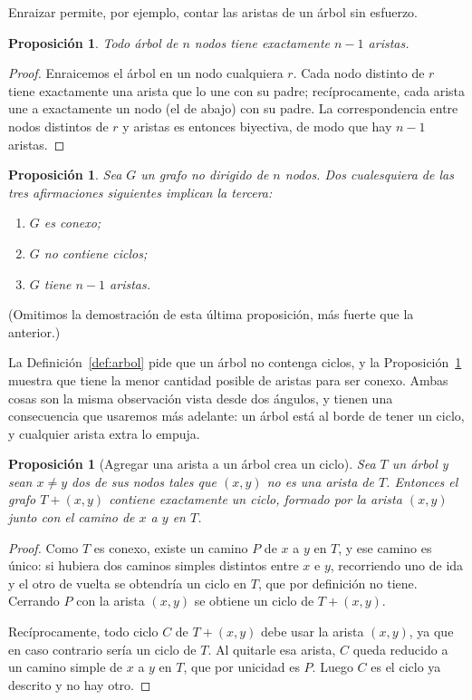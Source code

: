 \documentclass[12pt, spanish, oneside, openany]{book}
\theoremstyle{uprightplain}
\newtheorem{proposicion}[teorema]{Proposición}
\theoremstyle{definition}
\theoremstyle{remark}
\theoremstyle{definition}
\begin{document}
Enraizar permite, por ejemplo, contar las aristas de un árbol sin esfuerzo.

\begin{proposicion}
\label{prop:arbol-aristas}
Todo árbol de $n$ nodos tiene exactamente $n-1$ aristas.
\end{proposicion}
\begin{proof}
Enraicemos el árbol en un nodo cualquiera $r$. Cada nodo distinto de $r$ tiene exactamente una arista que lo une con su padre; recíprocamente, cada arista une a exactamente un nodo (el de abajo) con su padre. La correspondencia entre nodos distintos de $r$ y aristas es entonces biyectiva, de modo que hay $n-1$ aristas.
\end{proof}

\begin{proposicion}
\label{prop:arbol-tres}
Sea $G$ un grafo no dirigido de $n$ nodos. Dos cualesquiera de las tres afirmaciones siguientes implican la tercera:
\begin{enumerate}[label=(\roman*)]
    \item $G$ es conexo;
    \item $G$ no contiene ciclos;
    \item $G$ tiene $n-1$ aristas.
\end{enumerate}
\end{proposicion}

(Omitimos la demostración de esta última proposición, más fuerte que la anterior.)

La Definición~\ref{def:arbol} pide que un árbol no contenga ciclos, y la Proposición~\ref{prop:arbol-aristas} muestra que tiene la menor cantidad posible de aristas para ser conexo. Ambas cosas son la misma observación vista desde dos ángulos, y tienen una consecuencia que usaremos más adelante: un árbol está al borde de tener un ciclo, y cualquier arista extra lo empuja.

\begin{proposicion}[Agregar una arista a un árbol crea un ciclo]
\label{prop:arbol-mas-arista}
Sea $T$ un árbol y sean $x\neq y$ dos de sus nodos tales que $(x,y)$ no es una arista de $T$. Entonces el grafo $T+(x,y)$ contiene exactamente un ciclo, formado por la arista $(x,y)$ junto con el camino de $x$ a $y$ en $T$.
\end{proposicion}
\begin{proof}
Como $T$ es conexo, existe un camino $P$ de $x$ a $y$ en $T$, y ese camino es único: si hubiera dos caminos simples distintos entre $x$ e $y$, recorriendo uno de ida y el otro de vuelta se obtendría un ciclo en $T$, que por definición no tiene. Cerrando $P$ con la arista $(x,y)$ se obtiene un ciclo de $T+(x,y)$.

Recíprocamente, todo ciclo $C$ de $T+(x,y)$ debe usar la arista $(x,y)$, ya que en caso contrario sería un ciclo de $T$. Al quitarle esa arista, $C$ queda reducido a un camino simple de $x$ a $y$ en $T$, que por unicidad es $P$. Luego $C$ es el ciclo ya descrito y no hay otro.
\end{proof}
\end{document}
